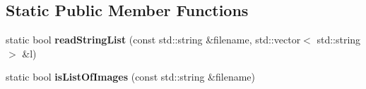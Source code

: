 \subsection*{Static Public Member Functions}
\begin{DoxyCompactItemize}
\item 
\mbox{\label{class_image_processing_1_1_settings_a993c90f02ccf14c1ddfe6a009bc2cb55}} 
static bool {\bfseries read\+String\+List} (const std\+::string \&filename, std\+::vector$<$ std\+::string $>$ \&l)
\item 
\mbox{\label{class_image_processing_1_1_settings_a52f9c0f12943a2ed76a7ab6592668420}} 
static bool {\bfseries is\+List\+Of\+Images} (const std\+::string \&filename)
\end{DoxyCompactItemize}
